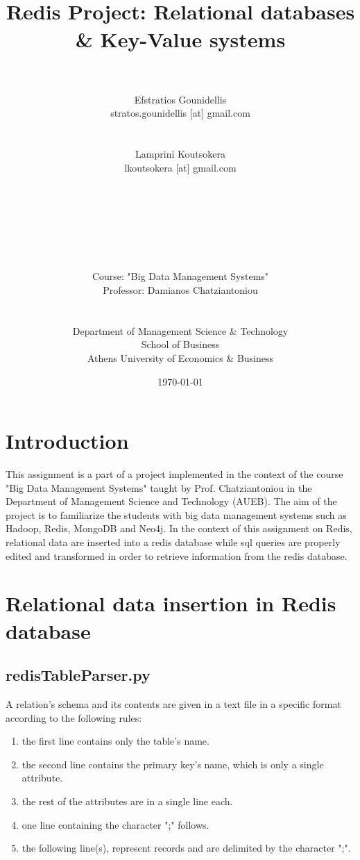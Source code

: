\documentclass[11pt]{article}
\title{
    \horrule{0.5pt} \\ [0.4cm]
    \huge  {Redis Project: Relational databases \& Key-Value systems}\\
    \horrule{2pt} \\[0.5cm]	
\vspace{10px}
}
\author{\large Efstratios Gounidellis\\stratos.gounidellis [at] gmail.com \\ \\ \\ 
		Lamprini Koutsokera\\lkoutsokera [at] gmail.com \\ \\ \\ \\ \\ \\ \\ \\
Course: "Big Data Management Systems"
\\
Professor: Damianos Chatziantoniou
\\ \\ \\
\vspace{40px}
Department of Management Science \& Technology
\\ School of Business
\\
Athens University of Economics \& Business} %
\date{
\vfill \large\today} %
\begin{document}
    
\maketitle

\pagebreak 

\tableofcontents

\pagebreak 
 
\section{Introduction}\label{introduction}
This assignment is a part of a project implemented in the context of the course "Big Data Management Systems" taught by Prof. Chatziantoniou in the Department of Management Science and Technology (AUEB). The aim of the project is to familiarize the students with big data management systems such as Hadoop, Redis, MongoDB and Neo4j.
\newline\newline\noindent
In the context of this assignment on Redis, relational data are inserted into a redis database while sql queries are properly edited and transformed in order to retrieve information from the redis database.

\section{Relational data insertion in Redis database}\label{relational-data-insertion-in-redis-database}

\subsection{redisTableParser.py}\label{redisTableParser.py}
A relation's schema and its contents are given in a text file in a specific format according to the following rules:
\begin{enumerate}
	\item the first line contains only the table's name.
	\item the second line contains the primary key's name, which is only a single attribute.
	\item the rest of the attributes are in a single line each.
	\item one line containing the character ";" follows.
	\item the following line(s), represent records and are delimited by the character ";".
\end{enumerate}
 
\end{document}

